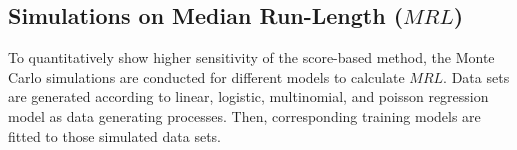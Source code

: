 \documentclass[twoside,11pt]{article}
\begin{document}
\begin{appendix}


\section{Simulations on Median Run-Length ($MRL$)}
\label{ss:simu_MRL}
To quantitatively show higher sensitivity of the score-based method, the Monte Carlo simulations are conducted for different models to calculate $MRL$. Data sets are generated according to linear, logistic, multinomial, and poisson regression model as data generating processes. Then, corresponding training models are fitted to those simulated data sets.


\end{appendix}
\end{document}
